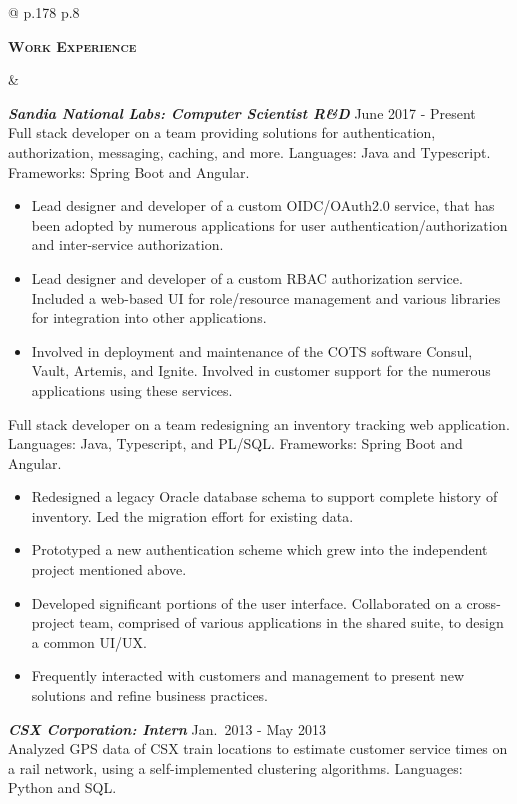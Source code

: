 \documentclass[10pt]{article}
\newcommand{\titlecell}[1]{%
  \begin{minipage}[t]{\linewidth}
    \raggedleft \textbf{#1}
\end{minipage}}
\newcommand{\contentcell}[1]{%
  \begin{minipage}[t]{\linewidth}
    #1
\end{minipage}}
\newcommand{\tablerowskip}{\vspace{1mm} \\}
\newcommand{\projectskip}{\vspace{3mm}}
\newcommand{\contentcellheader}[1]{\textbf{\textsl{#1}}}
\begin{document}
        \noindent
        \begin{tabular}{@{} p{.178\textwidth} p{.8\textwidth}}
          \titlecell{\textsc{Work Experience}} &
          \contentcell{
            \contentcellheader{Sandia National Labs: Computer Scientist R\&D} \hfill June 2017 - Present \\
            Full stack developer on a team providing solutions for authentication, authorization, messaging, caching, and more. Languages: Java and Typescript. Frameworks: Spring Boot and Angular.
            \begin{itemize}[itemsep=0pt,topsep=0pt,leftmargin=*] \itemsep -2pt
            \item Lead designer and developer of a custom OIDC/OAuth2.0 service, that has been adopted by numerous applications for user authentication/authorization and inter-service authorization.
            \item Lead designer and developer of a custom RBAC authorization service. Included a web-based UI for role/resource management and various libraries for integration into other applications.
            \item Involved in deployment and maintenance of the COTS software Consul, Vault, Artemis, and Ignite. Involved in customer support for the numerous applications using these services.
            \end{itemize}
            \projectskip

            Full stack developer on a team redesigning an inventory tracking web application. Languages: Java, Typescript, and PL/SQL. Frameworks: Spring Boot and Angular.
            \begin{itemize}[itemsep=0pt,topsep=0pt,leftmargin=*] \itemsep -2pt
            \item Redesigned a legacy Oracle database schema to support complete history of inventory. Led the migration effort for existing data.
            \item Prototyped a new authentication scheme which grew into the independent project mentioned above.
            \item Developed significant portions of the user interface. Collaborated on a cross-project team, comprised of various applications in the shared suite, to design a common UI/UX.
		 \item Frequently interacted with customers and management to present new solutions and refine business practices.
            \end{itemize}
          }
          \projectskip

          \contentcell{
            \contentcellheader{CSX Corporation: Intern} \hfill Jan.\ 2013 - May 2013 \\
            Analyzed GPS data of CSX train locations to estimate customer service times on a rail network, using a self-implemented clustering algorithms. Languages: Python and SQL.
          }
        \end{tabular}
        \tablerowskip
\end{document}
